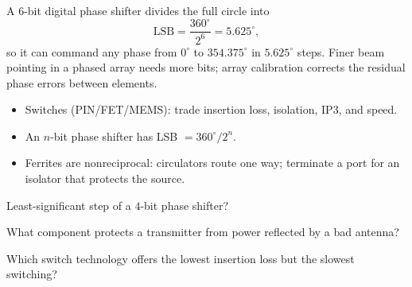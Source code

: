 \begin{workedexample}
A $6$-bit digital phase shifter divides the full circle into
\[ \text{LSB} = \frac{360^\circ}{2^{6}} = 5.625^\circ, \]
so it can command any phase from $0^\circ$ to $354.375^\circ$ in $5.625^\circ$
steps. Finer beam pointing in a phased array needs more bits; array calibration
corrects the residual phase errors between elements.
\end{workedexample}

\begin{keytakeaways}
\begin{itemize}[leftmargin=1.4em,itemsep=2pt]
\item Switches (PIN/FET/MEMS): trade insertion loss, isolation, IP3, and speed.
\item An $n$-bit phase shifter has LSB $= 360^\circ/2^n$.
\item Ferrites are nonreciprocal: circulators route one way; terminate a port for an isolator that protects the source.
\end{itemize}
\end{keytakeaways}

\begin{exercises}
\item Least-significant step of a $4$-bit phase shifter?
\item What component protects a transmitter from power reflected by a bad antenna?
\item Which switch technology offers the lowest insertion loss but the slowest switching?
\end{exercises}

